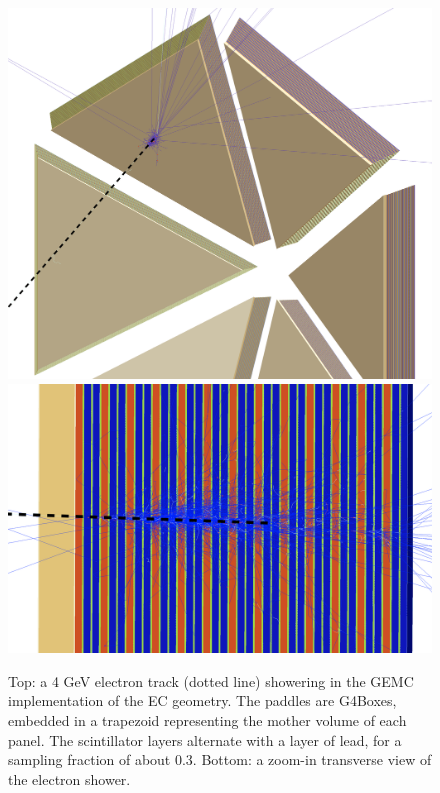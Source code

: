 \begin{figure}
	\centering
	\includegraphics[width=0.99\columnwidth,keepaspectratio]{img/ecGeometry.png}
	\includegraphics[width=0.99\columnwidth,keepaspectratio]{img/ecDetail.png}
	\caption{Top: a 4 GeV electron track (dotted line) showering in the GEMC implementation of the EC geometry.
            The paddles are G4Boxes, embedded in a trapezoid representing the mother volume of each panel.
            The scintillator layers alternate with a layer of lead, for a sampling fraction of about 0.3.
            Bottom: a zoom-in transverse view of the electron shower.}
	\label{fig:ecGeometry}
\end{figure}


